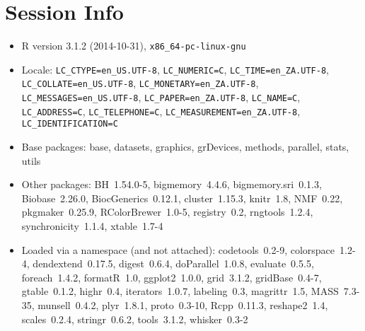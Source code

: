 \documentclass[a4paper]{article}\usepackage[]{graphicx}\usepackage[]{color}
\begin{document}
\section{Session Info}
\begin{itemize}\raggedright
  \item R version 3.1.2 (2014-10-31), \verb|x86_64-pc-linux-gnu|
  \item Locale: \verb|LC_CTYPE=en_US.UTF-8|, \verb|LC_NUMERIC=C|, \verb|LC_TIME=en_ZA.UTF-8|, \verb|LC_COLLATE=en_US.UTF-8|, \verb|LC_MONETARY=en_ZA.UTF-8|, \verb|LC_MESSAGES=en_US.UTF-8|, \verb|LC_PAPER=en_ZA.UTF-8|, \verb|LC_NAME=C|, \verb|LC_ADDRESS=C|, \verb|LC_TELEPHONE=C|, \verb|LC_MEASUREMENT=en_ZA.UTF-8|, \verb|LC_IDENTIFICATION=C|
  \item Base packages: base, datasets, graphics, grDevices,
    methods, parallel, stats, utils
  \item Other packages: BH~1.54.0-5, bigmemory~4.4.6,
    bigmemory.sri~0.1.3, Biobase~2.26.0, BiocGenerics~0.12.1,
    cluster~1.15.3, knitr~1.8, NMF~0.22, pkgmaker~0.25.9,
    RColorBrewer~1.0-5, registry~0.2, rngtools~1.2.4,
    synchronicity~1.1.4, xtable~1.7-4
  \item Loaded via a namespace (and not attached):
    codetools~0.2-9, colorspace~1.2-4, dendextend~0.17.5,
    digest~0.6.4, doParallel~1.0.8, evaluate~0.5.5, foreach~1.4.2,
    formatR~1.0, ggplot2~1.0.0, grid~3.1.2, gridBase~0.4-7,
    gtable~0.1.2, highr~0.4, iterators~1.0.7, labeling~0.3,
    magrittr~1.5, MASS~7.3-35, munsell~0.4.2, plyr~1.8.1,
    proto~0.3-10, Rcpp~0.11.3, reshape2~1.4, scales~0.2.4,
    stringr~0.6.2, tools~3.1.2, whisker~0.3-2
\end{itemize}


\printbibliography[heading=bibintoc]
\end{document}
